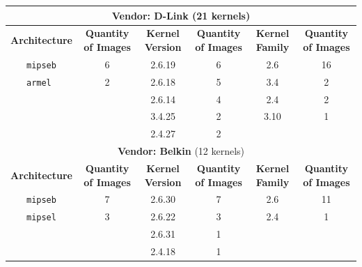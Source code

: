 \begin{table}[H]
{\begin{tabular}{|c|c|c|c|c|c|}
\multicolumn{6}{|c|}{\textbf{Vendor: D-Link} (21 kernels)}                                                                    \\ \hline
\textbf{Architecture} & \multicolumn{1}{c|}{\textbf{Quantity of Images}} & \textbf{Kernel Version} & \multicolumn{1}{c|}{\textbf{Quantity of Images}} & \textbf{Kernel Family} & \textbf{Quantity of Images} \\ \hline
{\tt mipseb}            & \multicolumn{1}{c|}{6}                & 2.6.19                 & \multicolumn{1}{c|}{6}                           & 2.6                     & 16                         \\
{\tt armel }            & \multicolumn{1}{c|}{2}                & 2.6.18                  & \multicolumn{1}{c|}{5}                          & 3.4                     & 2                          \\
                        & \multicolumn{1}{c|}{}                 & 2.6.14                  & \multicolumn{1}{c|}{4}                          & 2.4                     & 2                          \\
                        & \multicolumn{1}{c|}{}                 & 3.4.25                  & \multicolumn{1}{c|}{2}                          & 3.10                    & 1                          \\
                        & \multicolumn{1}{c|}{}                 & 2.4.27                  & \multicolumn{1}{c|}{2}                          &                         &                            \\ \hline

\multicolumn{6}{|c|}{\textbf{Vendor: Belkin} (12 kernels)}                                                                    \\ \hline
\textbf{Architecture} & \multicolumn{1}{c|}{\textbf{Quantity of Images}} & \textbf{Kernel Version} & \multicolumn{1}{c|}{\textbf{Quantity of Images}} & \textbf{Kernel Family} & \textbf{Quantity of Images} \\ \hline
{\tt mipseb}            & \multicolumn{1}{c|}{7}                & 2.6.30                  & \multicolumn{1}{c|}{7}                          & 2.6                     & 11                         \\
{\tt mipsel}            & \multicolumn{1}{c|}{3}                & 2.6.22                  & \multicolumn{1}{c|}{3}                          & 2.4                     & 1                          \\
                        & \multicolumn{1}{c|}{}                 & 2.6.31                  & \multicolumn{1}{c|}{1}                          &                         &                            \\
                        & \multicolumn{1}{c|}{}                 & 2.4.18                  & \multicolumn{1}{c|}{1}                          &                         &                            \\ \hline


\end{tabular}}
\end{table}
